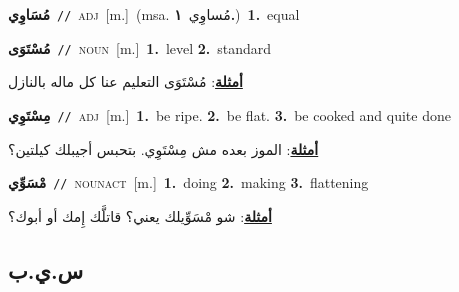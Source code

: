 \documentclass[10pt,a4paper,twoside]{article} %
\begin{document}
\begin{multicols}{2}
{\setlength\topsep{0pt}\textbf{\foreignlanguage{arabic}{مُسَاوِي}}\ {\color{gray}\texttt{//}\color{black}}\ \textsc{adj}\ [m.]\ \color{gray}(msa. \foreignlanguage{arabic}{مُساوِي}~\foreignlanguage{arabic}{\textbf{١.}})\color{black}\ \textbf{1.}~equal\ } \vspace{2mm}

{\setlength\topsep{0pt}\textbf{\foreignlanguage{arabic}{مُسْتَوَى}}\ {\color{gray}\texttt{//}\color{black}}\ \textsc{noun}\ [m.]\ \textbf{1.}~level  \textbf{2.}~standard\  \begin{flushright}\color{gray}\foreignlanguage{arabic}{\textbf{\underline{\foreignlanguage{arabic}{أمثلة}}}: مُسْتَوَى التعليم عنا كل ماله بالنازل}\end{flushright}\color{black}} \vspace{2mm}

{\setlength\topsep{0pt}\textbf{\foreignlanguage{arabic}{مِسْتَوِي}}\ {\color{gray}\texttt{//}\color{black}}\ \textsc{adj}\ [m.]\ \textbf{1.}~be ripe.  \textbf{2.}~be flat.  \textbf{3.}~be cooked and quite done\  \begin{flushright}\color{gray}\foreignlanguage{arabic}{\textbf{\underline{\foreignlanguage{arabic}{أمثلة}}}: الموز بعده مش مِسْتَوِي. بتحبس أجيبلك كيلتين؟}\end{flushright}\color{black}} \vspace{2mm}

{\setlength\topsep{0pt}\textbf{\foreignlanguage{arabic}{مْسَوِّي}}\ {\color{gray}\texttt{//}\color{black}}\ \textsc{noun\textunderscore act}\ [m.]\ \textbf{1.}~doing  \textbf{2.}~making  \textbf{3.}~flattening\  \begin{flushright}\color{gray}\foreignlanguage{arabic}{\textbf{\underline{\foreignlanguage{arabic}{أمثلة}}}: شو مْسَوِّيلك يعني؟ قاتلَّك إِمك أو أبوك؟}\end{flushright}\color{black}} \vspace{2mm}

\vspace{-3mm}
\subsection*{\color{blue}\foreignlanguage{arabic}{س.ي.ب}\color{blue}{}} 


\end{multicols}
\end{document}
